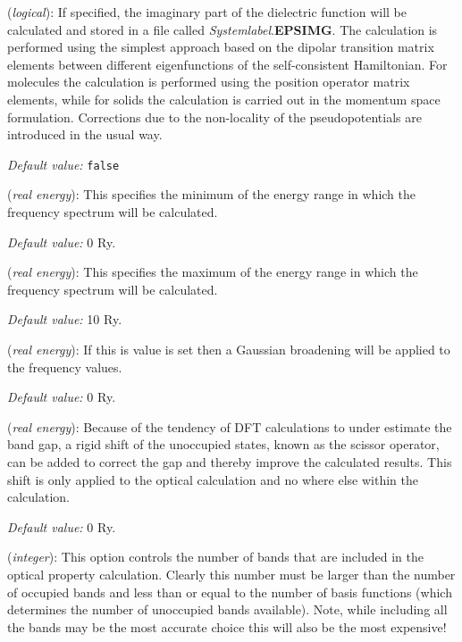 \documentclass[11pt]{article}
\begin{document}
\begin{description}
\itemsep 10pt
\parsep 0pt

\item[{\bf OpticalCalculation}] ({\it logical}):
If specified, the imaginary part of the dielectric function
will be calculated and stored in a file called {\it Systemlabel}.{\bf EPSIMG}.
The calculation is performed using the simplest approach based on the
dipolar transition matrix elements between different eigenfunctions
of the self-consistent Hamiltonian. For molecules the calculation
is performed using the position operator matrix elements, while
for solids the calculation is carried out in the momentum space
formulation.
Corrections due to the non-locality of the pseudopotentials
are introduced in the usual way.

{\it Default value:} {\tt false}

\item[{\bf Optical.EnergyMinimum}] ({\it real energy}):
This specifies the minimum of the energy range in which
the frequency spectrum will be calculated.

{\it Default value:} 0 Ry.

\item[{\bf Optical.EnergyMaximum}] ({\it real energy}):
This specifies the maximum of the energy range in which
the frequency spectrum will be calculated.

{\it Default value:} 10 Ry.

\item[{\bf Optical.Broaden}] ({\it real energy}):
If this is value is set then a Gaussian broadening will be
applied to the frequency values.

{\it Default value:} 0 Ry.

\item[{\bf Optical.Scissor}] ({\it real energy}):
Because of the tendency of DFT calculations to under estimate
the band gap, a rigid shift of the unoccupied states, known as
the scissor operator, can be added to correct the gap and
thereby improve the calculated results. This shift is only
applied to the optical calculation and no where else within
the calculation.

{\it Default value:} 0 Ry.

\item[{\bf Optical.NumberOfBands}] ({\it integer}):
This option controls the number of bands that are included in
the optical property calculation. Clearly this number must be
larger than the number of occupied bands and less than or
equal to the number of basis functions (which determines the
number of unoccupied bands available). Note, while including
all the bands may be the most accurate choice this will also
be the most expensive!


\end{description}
\end{document}
